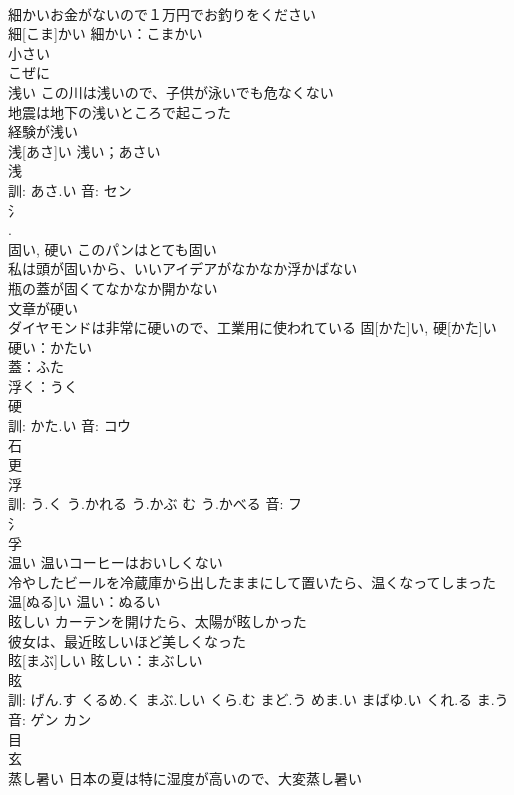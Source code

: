 \documentclass[8pt]{extreport}
\begin{document}
\begin{CJK}{UTF8}{min}
\\	細かいお金がないので１万円でお釣りをください 
\\	細[こま]かい			細かい：こまかい
\\	小さい 
\\	こぜに 
\\	浅い	この川は浅いので、子供が泳いでも危なくない 
\\	地震は地下の浅いところで起こった 
\\	経験が浅い 
\\	浅[あさ]い			浅い；あさい
\\	浅 
\\	訓: あさ.い 音: セン 
\\	氵 
\\	[淺].	
\\	固い, 硬い	このパンはとても固い 
\\	私は頭が固いから、いいアイデアがなかなか浮かばない 
\\	瓶の蓋が固くてなかなか開かない 
\\	文章が硬い 
\\	ダイヤモンドは非常に硬いので、工業用に使われている	固[かた]い, 硬[かた]い			硬い：かたい
\\	蓋：ふた
\\	浮く：うく
\\	硬 
\\	訓: かた.い 音: コウ 
\\	石 
\\	更 
\\	浮 
\\	訓: う.く う.かれる う.かぶ む う.かべる 音: フ 
\\	氵 
\\	孚 
\\	温い	温いコーヒーはおいしくない 
\\	冷やしたビールを冷蔵庫から出したままにして置いたら、温くなってしまった 
\\	温[ぬる]い			温い：ぬるい
\\	眩しい	カーテンを開けたら、太陽が眩しかった 
\\	彼女は、最近眩しいほど美しくなった 
\\	眩[まぶ]しい			眩しい：まぶしい
\\	眩 
\\	訓: げん.す くるめ.く まぶ.しい くら.む まど.う めま.い まばゆ.い くれ.る ま.う 音: ゲン カン 
\\	目 
\\	玄 
\\	蒸し暑い	日本の夏は特に湿度が高いので、大変蒸し暑い 

\end{CJK}
\end{document}
